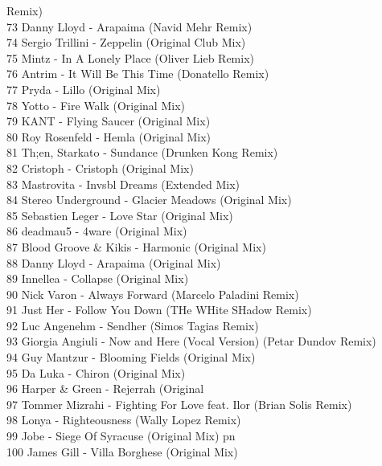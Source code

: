 \begin{multicols}{2}
Remix)\\ 73 Danny Lloyd - Arapaima (Navid Mehr Remix)\\ 74 Sergio Trillini - Zeppelin (Original Club Mix)\\ 75 Mintz - In A Lonely Place (Oliver Lieb Remix)\\ 76 Antrim - It Will Be This Time (Donatello Remix)\\ 77 Pryda - Lillo (Original Mix)\\ 78 Yotto - Fire Walk (Original Mix)\\ 79 KANT - Flying Saucer (Original Mix)\\ 80 Roy Rosenfeld - Hemla (Original Mix)\\ 81 Th;en, Starkato - Sundance (Drunken Kong Remix)\\ 82 Cristoph - Cristoph (Original Mix)\\ 83 Mastrovita - Invsbl Dreams (Extended Mix)\\ 84 Stereo Underground - Glacier Meadows (Original Mix)\\ 85 Sebastien Leger - Love Star (Original Mix)\\ 86 deadmau5 - 4ware (Original Mix)\\ 87 Blood Groove \& Kikis - Harmonic (Original Mix)\\ 88 Danny Lloyd - Arapaima (Original Mix)\\ 89 Innellea - Collapse (Original Mix)\\ 90 Nick Varon - Always Forward (Marcelo Paladini Remix)\\ 91 Just Her - Follow You Down (THe WHite SHadow Remix)\\ 92 Luc Angenehm - Sendher (Simos Tagias Remix)\\ 93 Giorgia Angiuli - Now and Here (Vocal Version) (Petar Dundov Remix)\\ 94 Guy Mantzur - Blooming Fields (Original Mix)\\ 95 Da Luka - Chiron (Original Mix)\\ 96 Harper \& Green - Rejerrah (Original\\ 97 Tommer Mizrahi - Fighting For Love feat. Ilor (Brian Solis Remix)\\ 98 Lonya - Righteousness (Wally Lopez Remix)\\ 99 Jobe - Siege Of Syracuse (Original Mix) pn\\ 100 James Gill - Villa Borghese (Original Mix)\\
\end{multicols}

